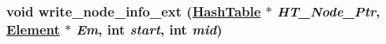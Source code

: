 \hypertarget{data__update_8C_a1}{
\subsubsection[write\_\-node\_\-info\_\-ext]{\setlength{\rightskip}{0pt plus 5cm}void write\_\-node\_\-info\_\-ext (\hyperlink{classHashTable}{Hash\-Table} $\ast$ {\em HT\_\-Node\_\-Ptr}, \hyperlink{classElement}{Element} $\ast$ {\em Em}, int {\em start}, int {\em mid})}}
\label{data__update_8C_a1}


